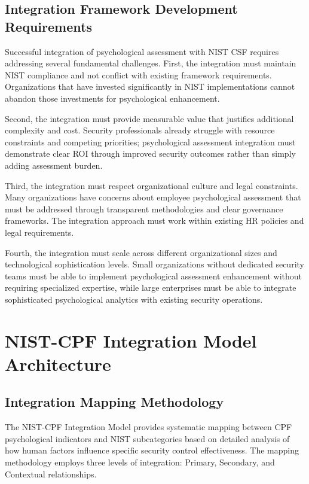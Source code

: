 \documentclass[10pt, twocolumn]{article}
\begin{document}
\subsection{Integration Framework Development Requirements}

Successful integration of psychological assessment with NIST CSF requires addressing several fundamental challenges. First, the integration must maintain NIST compliance and not conflict with existing framework requirements. Organizations that have invested significantly in NIST implementations cannot abandon those investments for psychological enhancement.

Second, the integration must provide measurable value that justifies additional complexity and cost. Security professionals already struggle with resource constraints and competing priorities; psychological assessment integration must demonstrate clear ROI through improved security outcomes rather than simply adding assessment burden.

Third, the integration must respect organizational culture and legal constraints. Many organizations have concerns about employee psychological assessment that must be addressed through transparent methodologies and clear governance frameworks. The integration approach must work within existing HR policies and legal requirements.

Fourth, the integration must scale across different organizational sizes and technological sophistication levels. Small organizations without dedicated security teams must be able to implement psychological assessment enhancement without requiring specialized expertise, while large enterprises must be able to integrate sophisticated psychological analytics with existing security operations.

\section{NIST-CPF Integration Model Architecture}

\subsection{Integration Mapping Methodology}

The NIST-CPF Integration Model provides systematic mapping between CPF psychological indicators and NIST subcategories based on detailed analysis of how human factors influence specific security control effectiveness. The mapping methodology employs three levels of integration: Primary, Secondary, and Contextual relationships.
\end{document}
